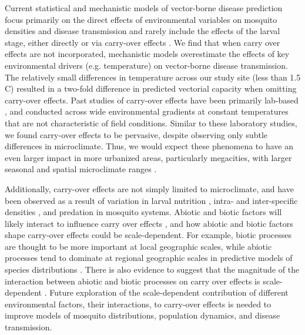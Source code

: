 \documentclass[12pt]{article}
\begin{document}
Current statistical and mechanistic models of vector-borne disease prediction focus primarily on the direct effects of environmental variables on mosquito densities and disease transmission and rarely include the effects of the larval stage, either directly or via carry-over effects \citep{mordecai2017,ezeakacha2015}. We find that when carry over effects are not incorporated, mechanistic models overestimate the effects of key environmental drivers (e.g. temperature) on vector-borne disease transmission. The relatively small differences in temperature across our study site (less than 1.5 \degree C) resulted in a two-fold difference in predicted vectorial capacity when omitting carry-over effects. Past studies of carry-over effects have been primarily lab-based \citep{alto2008, alto2005}, and conducted across wide environmental gradients at constant temperatures that are not characteristic of field conditions. Similar to these laboratory studies, we found carry-over effects to be pervasive, despite observing only subtle differences in microclimate. Thus, we would expect these phenomena to have an even larger impact in more urbanized areas, particularly megacities, with larger seasonal and spatial microclimate ranges \citep{peng2012}.

Additionally, carry-over effects are not simply limited to microclimate, and have been observed as a result of variation in larval nutrition \citep{moller-jacobs2014}, intra- and inter-specific densities \citep{ alto2005, alto2008}, and predation \citep{roux2015a} in mosquito systems. Abiotic and biotic factors will likely interact to influence carry over effects \citep{buckner2016, muturi2011d, muturi2012a}, and how abiotic and biotic factors shape carry-over effects could be scale-dependent. For example, biotic processes are thought to be more important at local geographic scales, while abiotic processes tend to dominate at regional geographic scales in predictive models of species distributions \citep{cohen2016}. There is also evidence to suggest that the magnitude of the interaction between abiotic and biotic processes on carry over effects is scale-dependent \citep{leisnham2014}. Future exploration of the scale-dependent contribution of different environmental factors, their interactions, to carry-over effects is needed to improve models of mosquito distributions, population dynamics, and disease transmission.
\end{document}
